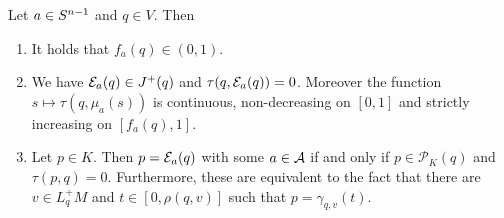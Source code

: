 \begin{lemma}\label{lem:observationtime}
Let $a\in S^{n-1}$ and $q \in V$. Then
\begin{enumerate}[label={\textnormal{(\arabic*)}}]
    \item It holds that $f_a(q)\in (0,1)$.
    \item We have $\mathcal{E}_a(q)\in J^+(q)$ and $\tau(q,\mathcal{E}_a(q))=0$. Moreover the function $s\mapsto\tau(q,\mu_a(s))$ is continuous, non-decreasing on $[0,1]$ and strictly increasing on $[f_a(q),1]$.
    \item Let $p\in K$. Then $p=\mathcal{E}_a(q)$ with some $a\in \mathcal{A}$ if and only if $p\in \mathcal{P}_K(q)$ and $\tau(p,q)=0$. Furthermore, these are equivalent to the fact that there are $v\in L^+_qM$ and $t\in[0,\rho(q,v)]$ such that $p=\gamma_{q,v}(t)$.
\end{enumerate}
\end{lemma}
